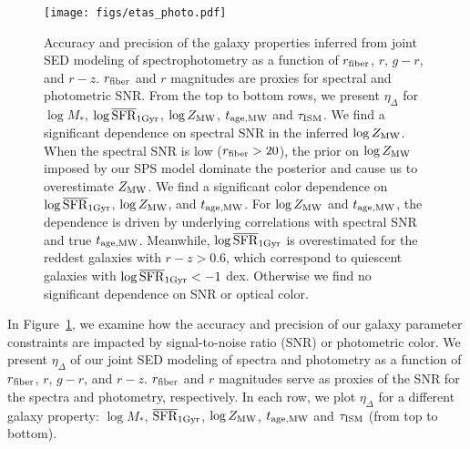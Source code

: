 \begin{figure}
\begin{center}
    \texttt{[image: figs/etas\_photo.pdf]}
    \caption{
        Accuracy and precision of the galaxy properties inferred from joint SED
        modeling of spectrophotometry as a function of $r_{\rm fiber}$, $r$,
        $g-r$, and $r-z$.
        $r_{\rm fiber}$ and $r$ magnitudes are proxies for spectral and
        photometric SNR. 
        From the top to bottom rows, we present $\eta_\Delta$ for $\log M_*$,
        $\log\overline{\rm SFR}_{\rm 1Gyr}$, $\log Z_{\rm MW}$, $t_{\rm age, MW}$ and 
        $\tau_{\rm ISM}$.
        We find a significant dependence on spectral SNR in the inferred 
        $\log Z_{\rm MW}$. 
        When the spectral SNR is low ($r_{\rm fiber} > 20$), the prior on 
        $\log Z_{\rm MW}$ imposed by our SPS model dominate the posterior and
        cause us to overestimate $Z_{\rm MW}$. 
        We find a significant color dependence on $\log\overline{\rm SFR}_{\rm 1Gyr}$, $\log Z_{\rm
        MW}$, and $t_{\rm age, MW}$. 
        For $\log Z_{\rm MW}$ and $t_{\rm age, MW}$, the dependence is driven by underlying
        correlations with spectral SNR and true $t_{\rm age, MW}$. 
        Meanwhile, $\log\overline{\rm SFR}_{\rm 1Gyr}$ is overestimated for the reddest galaxies with
        $r - z > 0.6$, which correspond to quiescent galaxies with $\log\overline{\rm SFR}_{\rm 1Gyr}
        < -1$ dex. 
        Otherwise we find no significant dependence on SNR or optical color. 
    }    
    \label{fig:eta_photo}
\end{center}
\end{figure}

In Figure~\ref{fig:eta_photo}, we examine how the accuracy and precision of
our galaxy parameter constraints are impacted by signal-to-noise ratio (SNR) or
photometric color. 
We present $\eta_\Delta$ of our joint SED modeling of spectra and photometry as
a function of $r_{\rm fiber}$, $r$, $g-r$, and $r-z$. 
$r_{\rm fiber}$ and $r$ magnitudes serve as proxies of the SNR for the spectra
and photometry, respectively. 
In each row, we plot $\eta_\Delta$ for a different galaxy property: $\log M_*$,
$\overline{\rm SFR}_{\rm 1Gyr}$, $\log Z_{\rm MW}$, $t_{\rm age, MW}$ and $\tau_{\rm ISM}$ (from top to bottom).

